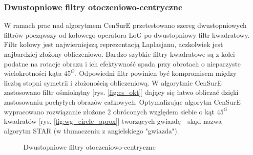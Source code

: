 \subsubsection{Dwustopniowe filtry otoczeniowo-centryczne}

W ramach prac nad algorytmem {CenSurE} przetestowano szereg dwustopniowych filtrów począwszy od kołowego operatora LoG po dwustopniowy filtr kwadratowy. Filtr kołowy jest najwierniejszą reprezentacją Laplasjanu, aczkolwiek jest najbardziej złożony obliczeniowo. Bardzo szybkie filtry kwadratowe są z kolei podatne na rotacje obrazu i ich efektywność spada przy obrotach o nieparzyste wielokrotności kąta $45^O$. Odpowiedni filtr powinien być kompromisem między liczbą stopni symetrii i złożonością obliczeniową. W algorytmie {CenSurE} zastosowano filtr ośmiokątny [rys. \ref{fig:cs_okt}] dający się łatwo obliczać dzięki zastosowaniu pochyłych obrazów całkowych. Optymalizując algorytm {CenSurE} wypracowano rozwiązanie złożone 2 obróconych względem siebie o kąt $45^O$ kwadratów [rys. \ref{fig:wg_circle_aprox}] tworzących gwiazdę - skąd nazwa algorytm STAR (w tłumaczeniu z angielskiego "gwiazda").



\begin{figure}[!htb]
\centering
{}
\caption{Dwustopniowe filtry otoczeniowo-centryczne}
\label{fig:star_bi_filters}
\end{figure}


